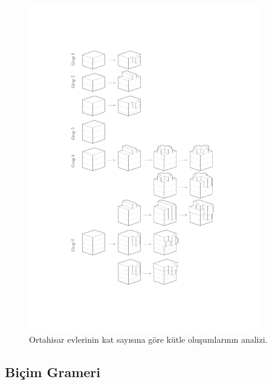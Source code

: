 \documentclass[12pt,turkish,a4paperpaper,]{report}
\begin{document}
\begin{figure}
\centering
\includegraphics[width=0.9\textwidth,height=\textheight]{source/figures/kutlegrameri.pdf}
\caption{Ortahisar evlerinin kat sayısına göre kütle oluşumlarının
analizi. \label{katgruplama}}
\end{figure}

\newpage

\hypertarget{biuxe7im-grameri}{%
\subsection{Biçim Grameri}\label{biuxe7im-grameri}}
\end{document}
